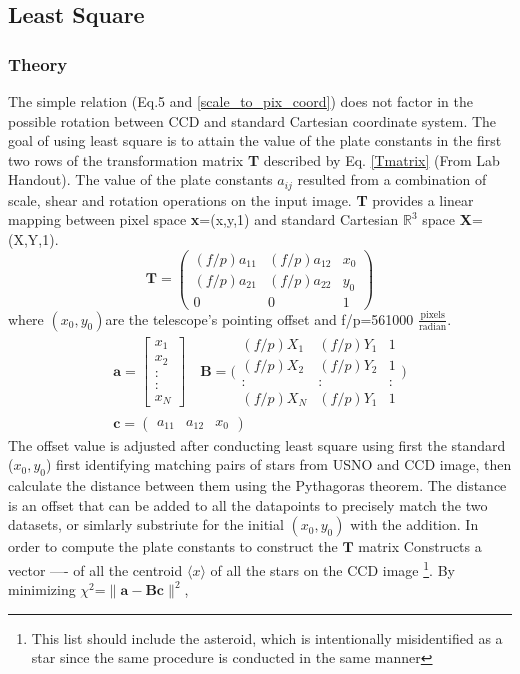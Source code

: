 \documentclass[authoryear, 12pt,5p, times]{elsarticle}
\begin{document}
	\subsection{Least Square}\label{ls}
	\subsubsection{Theory}
	The simple relation (Eq.5 and \ref{scale_to_pix_coord}) does not factor in the possible rotation between CCD and standard Cartesian coordinate system. The goal of using least square is to attain the value of the plate constants in the first two rows of the transformation matrix \textbf{T} described by Eq. \ref{Tmatrix} (From Lab Handout). The value of the plate constants $a_{ij}$ resulted from a combination of scale, shear and rotation operations on the input image. \textbf{T} provides a linear mapping between pixel space \textbf{x}=(x,y,1)  and standard Cartesian $\mathbb{R}^3$ space \textbf{X}=(X,Y,1). 
	\begin{equation}
\textbf{T}=	\begin{pmatrix}
(f/p)a_{11} & (f/p)a_{12} & x_0\\ 
(f/p)a_{21} & (f/p)a_{22} & y_0\\ 
0 &0  & 1
\end{pmatrix}
	\label{Tmatrix}
	\end{equation}
where $(x_0 , y_0)$are the telescope's pointing offset and f/p=561000 $\frac{\textrm{pixels}}{\textrm{radian}}$. 
\begin{align}
\textbf{a}= \begin{bmatrix}
 x_1
\\ x_2
\\ :
\\:
\\x_N
\end{bmatrix}
\quad
\textbf{B}=\Bigg(\begin{smallmatrix}
(f/p)X_1 & (f/p)Y_1  & 1\\ 
(f/p)X_2  & (f/p)Y_2  & 1\\ 
: &:  &: \\ 
(f/p)X_N  &(f/p)Y_1   & 1
\end{smallmatrix}\Bigg)
\\
\textbf{c} = \begin{pmatrix}
a_{11} & a_{12} & x_0 
\end{pmatrix}
\end{align}
The offset value is adjusted after conducting least square using first the standard ($x_0,y_0$)  first identifying matching pairs of stars from USNO and CCD image, then calculate the distance between them using the Pythagoras theorem. The distance is an offset that can be added to all the datapoints to precisely match the two datasets, or simlarly substriute for the initial $(x_0, y_0)$ with the addition.
		In order to compute the plate constants to construct the $\textbf{T}$ matrix
	Constructs a vector ---- of all the centroid $\langle x\rangle$ of all the stars on the CCD image \footnote{This list should include the asteroid, which is intentionally misidentified as a star since the same procedure is conducted in the same manner}.
		By minimizing $\chi^2$=$\|\textbf{a}-\textbf{Bc}\|^2$, 
	
\end{document}
